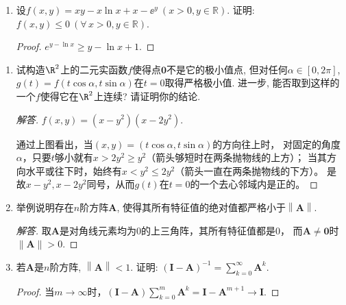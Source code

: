 \begin{2a}
\begin{enumerate}
\item 设\(f(x,y)=xy-x\ln x+x-\ee^y\ (x>0,y\in\mathbb{R})\). 
证明: \(f(x,y)\leqslant 0\ (\forall\, x>0,y\in\mathbb{R})\).
\begin{proof}
\(e^{y-\ln x} \geqslant y-\ln x+1\).
\end{proof}
\end{enumerate}
\end{2a}

\begin{2b}
\begin{enumerate}
\item 试构造\(\R^2\)上的二元实函数\(f\)使得点\(\boldsymbol{0}\)不是它的极小值点, 
但对任何\(\alpha\in[0,2\pi]\), \(g(t)=f(t\cos\alpha,t\sin\alpha)\)在\(t=0\)取得严格极小值. 
进一步, 能否取到这样的一个\(f\)使得它在\(\R^2\)上连续? 请证明你的结论.
\begin{proof}[解答]
$f(x,y)=(x-y^2)(x-2y^2)$.
通过上图看出，当$(x,y)=(t\cos\alpha,t\sin\alpha)$的方向往上时，
对固定的角度$\alpha$，只要$t$够小就有$x>2y^2\geqslant y^2$（箭头够短时在两条抛物线的上方）；
当其方向水平或往下时，始终有$x<y^2\leqslant 2y^2$（箭头一直在两条抛物线的下方）。
是故$x-y^2,x-2y^2$同号，从而$g(t)$在$t=0$的一个去心邻域内是正的。
\end{proof}

\item 举例说明存在\(n\)阶方阵\(\boldsymbol{A}\), 
使得其所有特征值的绝对值都严格小于\(\left\|\boldsymbol{A}\right\|\).
\begin{proof}[解答]
取$\boldsymbol{A}$是对角线元素均为\(0\)的上三角阵，其所有特征值都是\(0\)，
而\(\boldsymbol{A}\ne\boldsymbol0\)时\(\|\boldsymbol{A}\|>0\).
\end{proof}

\item 若\(\boldsymbol{A}\)是\(n\)阶方阵, \(\left\|\boldsymbol{A}\right\|<1\). 
证明: \(\left(\boldsymbol{I}-\boldsymbol{A}\right)^{-1}
=\sum_{k=0}^{\infty}\boldsymbol{A}^k.\)
\begin{proof}
当$m\to\infty$时，\((\boldsymbol{I}-\boldsymbol{A})\sum_{k=0}^{m}\boldsymbol{A}^k
=\boldsymbol{I}-\boldsymbol{A}^{m+1}\to\boldsymbol{I}\).
\end{proof}


\end{enumerate}
\end{2b}
